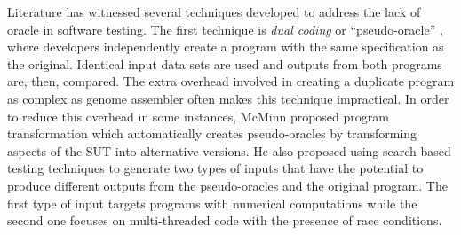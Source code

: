 Literature has witnessed several techniques developed to address the lack of oracle in software testing. The first technique is \emph{dual coding}
or ``pseudo-oracle'' \cite{weyuker1982testing}, where developers independently create a program with the same specification as
the original. Identical input data sets are used and outputs from both programs are, then, compared.
The extra overhead involved in creating a duplicate program as complex as genome assembler often makes this technique impractical.
In order to reduce this overhead in some instances,
McMinn \cite{McMinn:2009:SFD:1569901.1570127} proposed program transformation which automatically creates pseudo-oracles
by transforming aspects of the SUT into alternative versions. He also proposed using search-based
testing techniques to generate two types of inputs that have the potential to produce different outputs from the pseudo-oracles and the original program. The first type of input targets programs with numerical computations while the second one focuses on multi-threaded code with the presence of race conditions.

